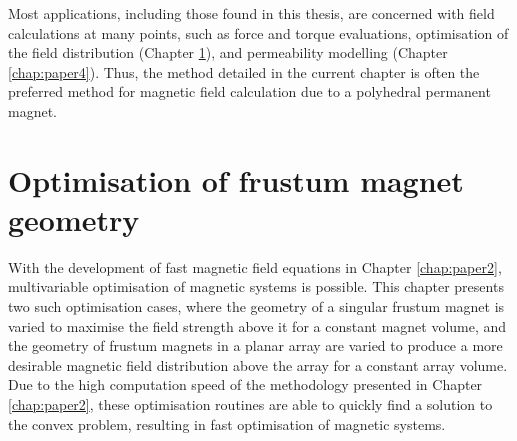 \documentclass[11pt,a4paper,twoside]{book}
\begin{document}
Most applications, including those found in this thesis, are concerned with field calculations at many points, such as force and torque evaluations, optimisation of the field distribution (Chapter \ref{chap:paper3}), and permeability modelling (Chapter \ref{chap:paper4}). Thus, the method detailed in the current chapter is often the preferred method for magnetic field calculation due to a polyhedral permanent magnet.

\chapter{Optimisation of frustum magnet geometry}\label{chap:paper3}
With the development of fast magnetic field equations in Chapter \ref{chap:paper2}, multivariable optimisation of magnetic systems is possible. This chapter presents two such optimisation cases, where the geometry of a singular frustum magnet is varied to maximise the field strength above it for a constant magnet volume, and the geometry of frustum magnets in a planar array are varied to produce a more desirable magnetic field distribution above the array for a constant array volume. Due to the high computation speed of the methodology presented in Chapter \ref{chap:paper2}, these optimisation routines are able to quickly find a solution to the convex problem, resulting in fast optimisation of magnetic systems.

\end{document}
